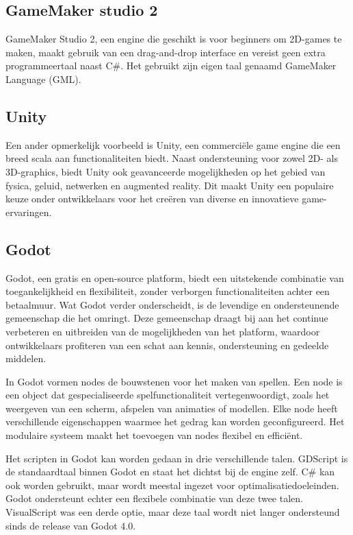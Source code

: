 \subsection{GameMaker studio 2}
GameMaker Studio 2, een engine die geschikt is voor beginners om 2D-games te maken, maakt gebruik van een drag-and-drop interface en vereist geen extra programmeertaal naast C\#. Het gebruikt zijn eigen taal genaamd GameMaker Language (GML). \autocite{cossu2019game}

\subsection{Unity}
Een ander opmerkelijk voorbeeld is Unity, een commerciële game engine die een breed scala aan functionaliteiten biedt. Naast ondersteuning voor zowel 2D- als 3D-graphics, biedt Unity ook geavanceerde mogelijkheden op het gebied van fysica, geluid, netwerken en augmented reality. Dit maakt Unity een populaire keuze onder ontwikkelaars voor het creëren van diverse en innovatieve game-ervaringen. \autocite{Haas2014}

\subsection{Godot}
Godot, een gratis en open-source platform, biedt een uitstekende combinatie van toegankelijkheid en flexibiliteit, zonder verborgen functionaliteiten achter een betaalmuur. Wat Godot verder onderscheidt, is de levendige en ondersteunende gemeenschap die het omringt. Deze gemeenschap draagt bij aan het continue verbeteren en uitbreiden van de mogelijkheden van het platform, waardoor ontwikkelaars profiteren van een schat aan kennis, ondersteuning en gedeelde middelen. \autocite{Bradfield2018}

In Godot vormen nodes de bouwstenen voor het maken van spellen. Een node is een object dat gespecialiseerde spelfunctionaliteit vertegenwoordigt, zoals het weergeven van een scherm, afspelen van animaties of modellen. Elke node heeft verschillende eigenschappen waarmee het gedrag kan worden geconfigureerd. Het modulaire systeem maakt het toevoegen van nodes flexibel en efficiënt. \autocite{Bradfield2018}

Het scripten in Godot kan worden gedaan in drie verschillende talen. GDScript is de standaardtaal binnen Godot en staat het dichtst bij de engine zelf. C# kan ook worden gebruikt, maar wordt meestal ingezet voor optimalisatiedoeleinden. Godot ondersteunt echter een flexibele combinatie van deze twee talen.\autocite{Bradfield2018} VisualScript was een derde optie, maar deze taal wordt niet langer ondersteund sinds de release van Godot 4.0.

